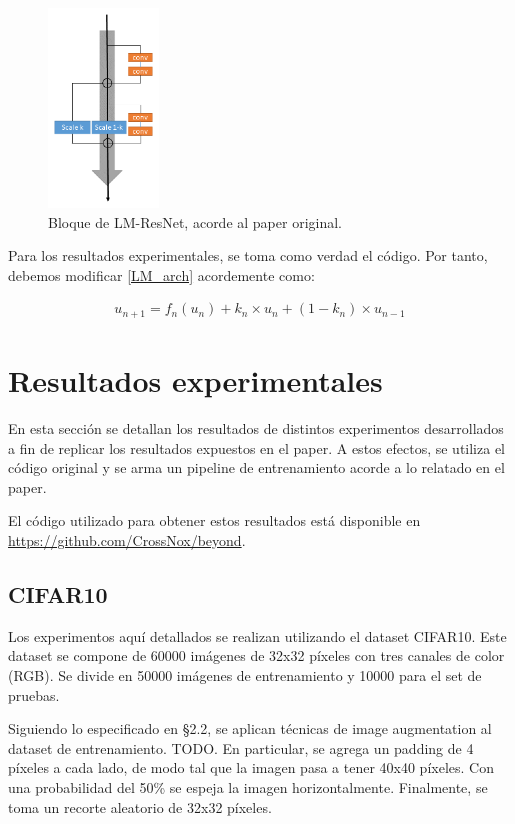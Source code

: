 \documentclass[titlepage,a4paper,oneside]{article}
\begin{document}
\begin{figure}[H]
\centering
\includegraphics[height=200px]{images/LM-Block-orig.png}
\caption{Bloque de LM-ResNet, acorde al paper original.}
\label{lmblockorig}
\end{figure}

Para los resultados experimentales, se toma como verdad el código. Por tanto, debemos modificar \ref{LM_arch} acordemente como:

\begin{align}
	u_{n+1} = f_n(u_n) + k_n \times u_n + (1-k_n) \times u_{n-1}
\end{align}

\section{Resultados experimentales}
En esta sección se detallan los resultados de distintos experimentos desarrollados a fin de replicar los resultados expuestos en el paper. A estos efectos, se utiliza el código original y se arma un pipeline de entrenamiento acorde a lo relatado en el paper.

El código utilizado para obtener estos resultados está disponible en \url{https://github.com/CrossNox/beyond}.

\subsection{CIFAR10}
Los experimentos aquí detallados se realizan utilizando el dataset CIFAR10. Este dataset se compone de 60000 imágenes de 32x32 píxeles con tres canales de color (RGB). Se divide en 50000 imágenes de entrenamiento y 10000 para el set de pruebas.

Siguiendo lo especificado en \S 2.2, se aplican técnicas de image augmentation al dataset de entrenamiento. TODO. En particular, se agrega un padding de 4 píxeles a cada lado, de modo tal que la imagen pasa a tener 40x40 píxeles. Con una probabilidad del 50\% se espeja la imagen horizontalmente. Finalmente, se toma un recorte aleatorio de 32x32 píxeles.
\end{document}
